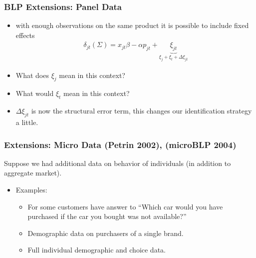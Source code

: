 \documentclass[aspectratio=169,11pt]{beamer}
\begin{document}
\begin{frame}
\frametitle{BLP Extensions: Panel Data}
\begin{itemize}
\item with enough observations on the same product it is possible to include fixed effects
\begin{eqnarray*}
\delta_{jt}(\Sigma) = x_{jt} \beta - \alpha p_{jt} + \underbrace{\xi_{jt}}_{\xi_{j} + \xi_t + \Delta \xi_{jt}}
\end{eqnarray*}
\item What does $\xi_{j}$ mean in this context?
\item What would $\xi_t$ mean in this context?
\item $\Delta \xi_{jt}$ is now the structural error term, this changes our identification strategy a little.
\end{itemize}
\end{frame}

\begin{frame}
\frametitle{Extensions: Micro Data (Petrin 2002), (microBLP 2004)}
Suppose we had additional data on behavior of individuals (in addition to aggregate market).
\begin{itemize}
\item Examples:
\begin{itemize}
\item For some customers have answer to ``Which car would you have purchased if the car you bought was not available?''
\item Demographic data on purchasers of a single brand.
\item Full individual demographic and choice data.
\end{itemize}
\end{itemize}
\end{frame}
\end{document}
